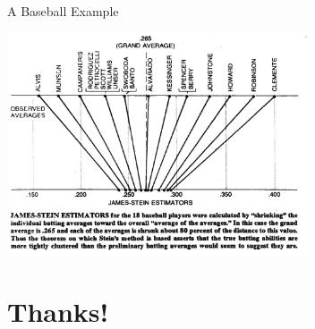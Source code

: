 \documentclass[aspectratio=169]{beamer}
\begin{document}
\begin{frame}[fragile]{A Baseball Example}
\begin{center}
\includegraphics[width=3.5in]{./resources/baseball2.png}
\end{center}
\end{frame}

\section*{Thanks!}
\end{document}
